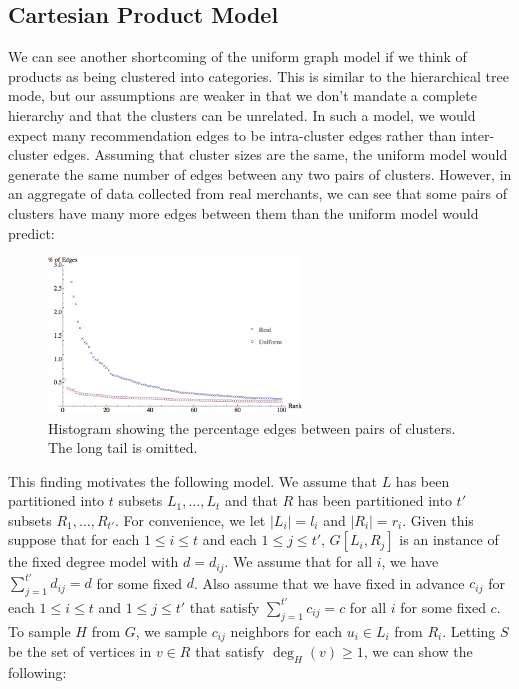 \subsection{Cartesian Product Model}
\label{cartesian}
We can see another shortcoming of the uniform graph model if we think
of products as being clustered into categories. This is similar to the
hierarchical tree mode, but our assumptions are weaker in that we don't
mandate a complete hierarchy and that the clusters can be unrelated. In
such a model, we would expect many recommendation edges to be
intra-cluster edges rather than inter-cluster edges. Assuming that
cluster sizes are the same, the uniform model would generate the same
number of edges between any two pairs of clusters. However, in an
aggregate of data collected from real merchants, we can see that some
pairs of clusters have many more edges between them than the uniform
model would predict:

\begin{figure}[h]
\centering
\includegraphics[width=0.6\textwidth]{images/cartesian_histogram.png}
\begin{minipage}[h]{0.7\textwidth}
\caption{Histogram showing the percentage edges between pairs of clusters. The long tail is omitted.}
\end{minipage}
\end{figure}

This finding motivates the following model. We assume that
$L$ has been partitioned into $t$ subsets $L_1,\ldots, L_t$ and
that $R$ has been partitioned into $t'$ subsets $R_1,\ldots,
R_{t'}$. For convenience, we let $|L_i| = l_i$ and $|R_i|=r_i$. Given
this suppose that for each $1\leq i\leq t$ and each $1\leq j\leq t'$,
$G[L_i, R_j]$ is an instance of the fixed degree model with
$d=d_{ij}$. We assume that for all $i$, we have $\sum_{j=1}^{t'}
d_{ij} = d$ for some fixed $d$. Also assume that we have fixed in
advance $c_{ij}$ for each $1\leq i\leq t$ and $1\leq j\leq t'$ that
satisfy $\sum_{j=1}^{t'} c_{ij} = c$ for all $i$ for some fixed $c$.
To sample $H$ from $G$, we sample $c_{ij}$ neighbors for each
$u_i\in L_i$ from $R_i$. Letting $S$ be the set of vertices in
$v\in R$ that satisfy $\deg_H(v)\geq 1$, we can show the following:

